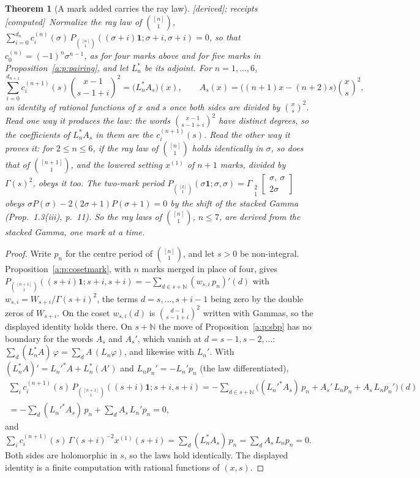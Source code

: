 \documentclass[11pt]{article}
\newcommand{\one}{\mathbf 1}
\newcommand{\Gst}[4]{\Gamma_{\substack{#1\\#2}}\!\begin{bmatrix}#3\\#4\end{bmatrix}}
\theoremstyle{plain}
\newtheorem{theorem}[proposition]{Theorem}
\theoremstyle{definition}
\theoremstyle{remark}
\newcommand{\derived}{\textup{[derived]}}
\newcommand{\computed}{\textup{[computed]}}
\begin{document}
\begin{theorem}[A mark added carries the ray law]\label{a:t:cert}\derived; receipts \computed\
Normalize the ray law of $\binom{[n]}1$, $\sum_{i=0}^{d_n}c^{(n)}_i(\sigma)\,P_{\binom{[n]}1}((\sigma+i)\one;\sigma+i,\sigma+i)=0$, so that $c_0^{(n)}=(-1)^n\sigma^{n-1}$, as for four marks above and for five marks in Proposition~\ref{a:p:pairing}, and let $L_n^\ast$ be its adjoint. For $n=1,\dots,6$,
\[
\sum_{i=0}^{d_{n+1}}c^{(n+1)}_i(s)\binom{x-1}{s-1+i}^{\!2}=\big(L_n^\ast A_s\big)(x),\qquad A_s(x)=\big((n+1)x-(n+2)s\big)\binom xs^{\!2},
\]
an identity of rational functions of $x$ and $s$ once both sides are divided by $\binom xs^2$. Read one way it produces the law: the words $\binom{x-1}{s-1+i}^2$ have distinct degrees, so the coefficients of $L_n^\ast A_s$ in them are the $c^{(n+1)}_i(s)$. Read the other way it proves it: for $2\le n\le6$, if the ray law of $\binom{[n]}1$ holds identically in $\sigma$, so does that of $\binom{[n+1]}1$, and the lowered setting $x^{(1)}$ of $n+1$ marks, divided by $\Gamma(s)^2$, obeys it too. The two-mark period $P_{\binom{[2]}1}(\sigma\one;\sigma,\sigma)=\Gst21{\sigma,\ \sigma}{2\sigma}$ obeys $\sigma P(\sigma)-2(2\sigma+1)P(\sigma+1)=0$ by the shift of the stacked Gamma (Prop.~1.3(iii), p.~11). So the ray laws of $\binom{[n]}1$, $n\le7$, are derived from the stacked Gamma, one mark at a time.
\end{theorem}

\begin{proof}
Write $p_n$ for the centre period of $\binom{[n]}1$, and let $s>0$ be non-integral. Proposition~\ref{a:p:cosetmark}, with $n$ marks merged in place of four, gives $P_{\binom{[n+1]}1}((s+i)\one;s+i,s+i)=-\sum_{d\in s+\mathbb N}(w_{s,i}\,p_n)'(d)$ with $w_{s,i}=W_{s+i}/\Gamma(s+i)^2$, the terms $d=s,\dots,s+i-1$ being zero by the double zeros of $W_{s+i}$. On the coset $w_{s,i}(d)$ is $\binom{d-1}{s-1+i}^2$ written with Gammas, so the displayed identity holds there. On $s+\mathbb N$ the move of Proposition~\ref{a:p:sbp} has no boundary for the words $A_s$ and $A_s'$, which vanish at $d=s-1,s-2,\dots$: $\sum_d(L_n^\ast A)\,\varphi=\sum_dA\,(L_n\varphi)$, and likewise with $L_n'$. With $(L_n^\ast A)'=L_n'^\ast A+L_n^\ast(A')$ and $L_np_n'=-L_n'p_n$ (the law differentiated),
\begin{multline*}
\sum_ic^{(n+1)}_i(s)\,P_{\binom{[n+1]}1}((s+i)\one;s+i,s+i)=-\sum_{d\in s+\mathbb N}\Big((L_n'^\ast A_s)\,p_n+A_s'\,L_np_n+A_s\,L_np_n'\Big)(d)\\
=-\sum_{d}(L_n'^\ast A_s)\,p_n+\sum_dA_s\,L_n'p_n=0,
\end{multline*}
and $\sum_ic^{(n+1)}_i(s)\,\Gamma(s+i)^{-2}x^{(1)}(s+i)=\sum_d(L_n^\ast A_s)\,p_n=\sum_dA_s\,L_np_n=0$. Both sides are holomorphic in $s$, so the laws hold identically. The displayed identity is a finite computation with rational functions of $(x,s)$.
\end{proof}
\end{document}
